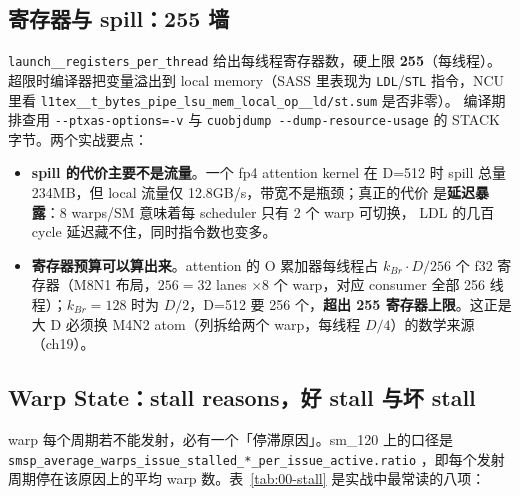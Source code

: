\subsection{寄存器与 spill：255 墙}

\texttt{launch\_\allowbreak{}\_\allowbreak{}registers\_\allowbreak{}per\_\allowbreak{}thread} 给出每线程寄存器数，硬上限
\textbf{255}（每线程）。超限时编译器把变量溢出到 local memory（SASS 里表现为
\texttt{LDL}/\texttt{STL} 指令，NCU 里看
\texttt{l1tex\_\allowbreak{}\_\allowbreak{}t\_\allowbreak{}bytes\_\allowbreak{}pipe\_\allowbreak{}lsu\_\allowbreak{}mem\_\allowbreak{}\allowbreak{}local\_\allowbreak{}op\_\allowbreak{}\_\allowbreak{}ld/\allowbreak{}st.sum} 是否非零）。
编译期排查用 \texttt{-{}-ptxas-options=\allowbreak{}-v} 与
\texttt{cuobjdump -{}-dump-resource-usage} 的 STACK 字节。两个实战要点：

\begin{itemize}
\item \textbf{spill 的代价主要不是流量}。一个 fp4 attention kernel 在
  D=512 时 spill 总量 234MB，但 local 流量仅 12.8GB/s，带宽不是瓶颈；真正的代价
  是\textbf{延迟暴露}：8 warps/SM 意味着每 scheduler 只有 2 个 warp 可切换，
  LDL 的几百 cycle 延迟藏不住，同时指令数也变多。
\item \textbf{寄存器预算可以算出来}。attention 的 O 累加器每线程占
  $k_{Br}\cdot D/256$ 个 f32 寄存器（M8N1 布局，$256=32$ lanes $\times 8$
  个 warp，对应 consumer 全部 256 线程）；$k_{Br}{=}128$ 时为
  $D/2$，D=512 要 256 个，\textbf{超出 255 寄存器上限}。这正是大 D 必须换
  M4N2 atom（列拆给两个 warp，每线程 $D/4$）的数学来源（ch19）。
\end{itemize}

\subsection{Warp State：stall reasons，好 stall 与坏 stall}

warp 每个周期若不能发射，必有一个「停滞原因」。sm\_120 上的口径是
\texttt{smsp\_\allowbreak{}average\_\allowbreak{}warps\_\allowbreak{}issue\_\allowbreak{}stalled\_\allowbreak{}*\_\allowbreak{}per\_\allowbreak{}issue\_\allowbreak{}active.\allowbreak{}ratio}
，即每个发射周期停在该原因上的平均 warp 数。表~\ref{tab:00-stall}
是实战中最常读的八项：

